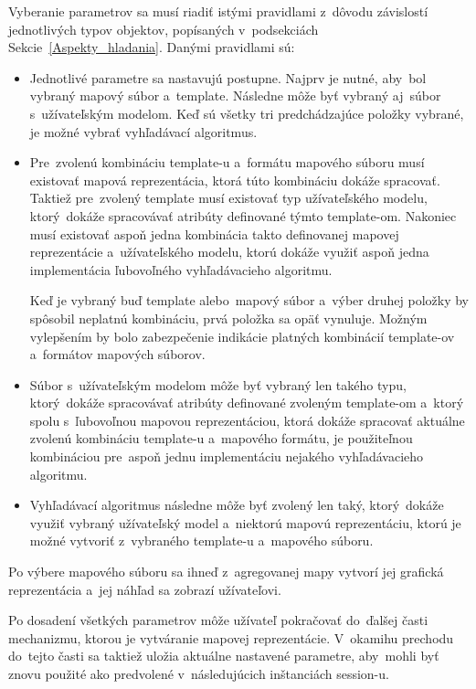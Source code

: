 Vyberanie parametrov sa musí riadiť istými pravidlami z~dôvodu závislostí jednotlivých typov objektov, popísaných v~podsekciách Sekcie~\ref{Aspekty_hladania}. Danými pravidlami sú:
\begin{itemize}
    \item Jednotlivé parametre sa nastavujú postupne. Najprv je nutné, aby~bol vybraný mapový súbor a~template. Následne môže byť vybraný aj~súbor s~užívateľským modelom. Keď sú všetky tri predchádzajúce položky vybrané, je možné vybrať vyhľadávací algoritmus. 
    \item Pre~zvolenú kombináciu template-u a~formátu mapového súboru musí existovať mapová reprezentácia, ktorá túto kombináciu dokáže spracovať. Taktiež pre~zvolený template musí existovať typ užívateľského modelu, ktorý~dokáže spracovávať atribúty definované týmto template-om. Nakoniec musí existovať aspoň jedna kombinácia takto definovanej mapovej reprezentácie a~užívateľského modelu, ktorú dokáže využiť aspoň jedna implementácia ľubovoľného vyhľadávacieho algoritmu.   
    
    Keď je vybraný buď template alebo~mapový súbor a~výber druhej položky by spôsobil neplatnú kombináciu, prvá položka sa opäť vynuluje. Možným vylepšením by bolo zabezpečenie indikácie platných kombinácií template-ov a~formátov mapových súborov.
    \item Súbor s~užívateľským modelom môže byť vybraný len takého typu, ktorý~dokáže spracovávať atribúty definované zvoleným template-om a~ktorý spolu s~ľubovoľnou mapovou reprezentáciou, ktorá dokáže spracovať aktuálne zvolenú kombináciu template-u a~mapového formátu, je použiteľnou kombináciou pre~aspoň jednu implementáciu nejakého vyhľadávacieho algoritmu. 
    \item Vyhľadávací algoritmus následne môže byť zvolený len taký, ktorý~dokáže využiť vybraný užívateľský model a~niektorú mapovú reprezentáciu, ktorú je možné vytvoriť z~vybraného template-u a~mapového súboru.
\end{itemize}    

Po výbere mapového súboru sa ihneď z~agregovanej mapy vytvorí jej grafická reprezentácia a~jej náhľad sa zobrazí užívateľovi.

Po dosadení všetkých parametrov môže užívateľ pokračovať do~ďalšej časti mechanizmu, ktorou je vytváranie mapovej reprezentácie. V~okamihu prechodu do~tejto časti sa taktiež uložia aktuálne nastavené parametre, aby~mohli byť znovu použité ako predvolené v~následujúcich inštanciách session-u. 

